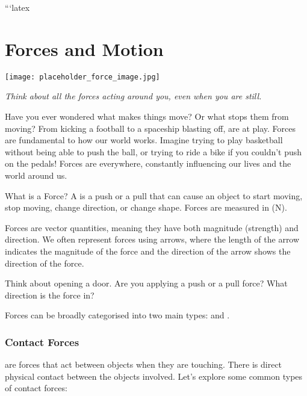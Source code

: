```latex
\chapter{Forces and Motion}

\begin{marginfigure}
\texttt{[image: placeholder\_force\_image.jpg]}
\caption*{\textit{Think about all the forces acting around you, even when you are still.}}
\end{marginfigure}

\FloatBarrier

Have you ever wondered what makes things move? Or what stops them from moving?  From kicking a football to a spaceship blasting off,  are at play.  Forces are fundamental to how our world works.  Imagine trying to play basketball without being able to push the ball, or trying to ride a bike if you couldn't push on the pedals!  Forces are everywhere, constantly influencing our lives and the world around us.

\begin{keyconcept}{What is a Force?}
A  is a push or a pull that can cause an object to start moving, stop moving, change direction, or change shape. Forces are measured in  (N).
\end{keyconcept}

Forces are vector quantities, meaning they have both magnitude (strength) and direction. We often represent forces using arrows, where the length of the arrow indicates the magnitude of the force and the direction of the arrow shows the direction of the force.

\begin{stopandthink}
Think about opening a door.  Are you applying a push or a pull force? What direction is the force in?
\end{stopandthink}

Forces can be broadly categorised into two main types:  and .

\subsection{Contact Forces}

\begin{marginnote}
\end{marginnote}
 are forces that act between objects when they are touching.  There is direct physical contact between the objects involved.  Let's explore some common types of contact forces:

